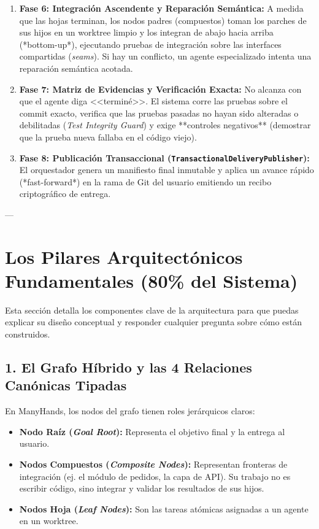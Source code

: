 \documentclass[11pt,a4paper]{article}
\begin{document}
\begin{enumerate}[leftmargin=1.5cm]
  \item \textbf{Fase 6: Integración Ascendente y Reparación Semántica:}  
  A medida que las hojas terminan, los nodos padres (compuestos) toman los parches de sus hijos en un worktree limpio y los integran de abajo hacia arriba (*bottom-up*), ejecutando pruebas de integración sobre las interfaces compartidas (\emph{seams}). Si hay un conflicto, un agente especializado intenta una reparación semántica acotada.

  \item \textbf{Fase 7: Matriz de Evidencias y Verificación Exacta:}  
  No alcanza con que el agente diga <<terminé>>. El sistema corre las pruebas sobre el commit exacto, verifica que las pruebas pasadas no hayan sido alteradas o debilitadas (\emph{Test Integrity Guard}) y exige **controles negativos** (demostrar que la prueba nueva fallaba en el código viejo).

  \item \textbf{Fase 8: Publicación Transaccional (\texttt{TransactionalDeliveryPublisher}):}  
  El orquestador genera un manifiesto final inmutable y aplica un avance rápido (*fast-forward*) en la rama de Git del usuario emitiendo un recibo criptográfico de entrega.
\end{enumerate}

---

\section{Los Pilares Arquitectónicos Fundamentales (80\% del Sistema)}

Esta sección detalla los componentes clave de la arquitectura para que puedas explicar su diseño conceptual y responder cualquier pregunta sobre cómo están construidos.

\subsection{1. El Grafo Híbrido y las 4 Relaciones Canónicas Tipadas}
En ManyHands, los nodos del grafo tienen roles jerárquicos claros:
\begin{itemize}
  \item \textbf{Nodo Raíz (\emph{Goal Root}):} Representa el objetivo final y la entrega al usuario.
  \item \textbf{Nodos Compuestos (\emph{Composite Nodes}):} Representan fronteras de integración (ej. el módulo de pedidos, la capa de API). Su trabajo no es escribir código, sino integrar y validar los resultados de sus hijos.
  \item \textbf{Nodos Hoja (\emph{Leaf Nodes}):} Son las tareas atómicas asignadas a un agente en un worktree.
\end{itemize}
\end{document}
